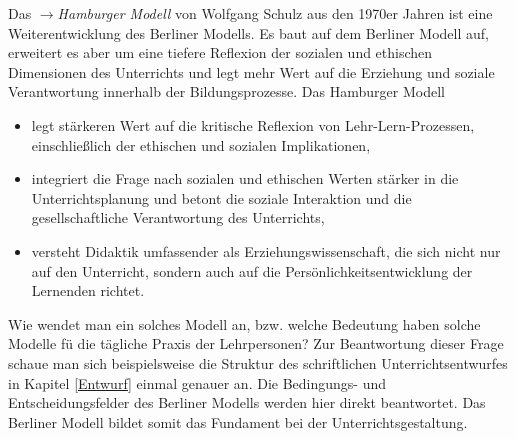 Das $\to$\emph{Hamburger Modell} von Wolfgang Schulz aus den 1970er Jahren ist eine Weiterentwicklung des Berliner Modells. Es baut auf dem Berliner Modell auf, erweitert es aber um eine tiefere Reflexion der sozialen und ethischen Dimensionen des Unterrichts und legt mehr Wert auf die Erziehung und soziale Verantwortung innerhalb der Bildungsprozesse. Das Hamburger Modell



\begin{itemize}

	\item  legt st\"{a}rkeren Wert auf die kritische Reflexion von Lehr-Lern-Prozessen, einschlie{\ss}lich der ethischen und sozialen Implikationen,

	\item integriert die Frage nach sozialen und ethischen Werten st\"{a}rker in die Unterrichtsplanung und betont die soziale Interaktion und die gesellschaftliche Verantwortung des Unterrichts,

	\item versteht Didaktik umfassender als Erziehungswissenschaft, die sich nicht nur auf den Unterricht, sondern auch auf die Pers\"{o}nlichkeitsentwicklung der Lernenden richtet.

\end{itemize}



Wie wendet man ein solches Modell an, bzw. welche Bedeutung haben solche Modelle f\"{u} die t\"{a}gliche Praxis der Lehrpersonen? Zur Beantwortung dieser Frage schaue man sich beispielsweise die Struktur des schriftlichen Unterrichtsentwurfes in Kapitel \ref{Entwurf} einmal genauer an. Die Bedingungs- und Entscheidungsfelder des Berliner Modells werden hier direkt beantwortet. Das Berliner Modell bildet somit das Fundament bei der Unterrichtsgestaltung.





